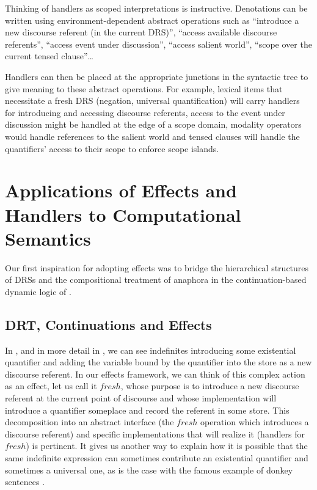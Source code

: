 \documentclass{article}
\begin{document}
Thinking of handlers as scoped interpretations is instructive. Denotations can
be written using environment-dependent abstract operations such as ``introduce
a new discourse referent (in the current DRS)'', ``access available discourse
referents'', ``access event under discussion'', ``access salient world'',
``scope over the current tensed clause''\ldots

Handlers can then be placed at the appropriate junctions in the syntactic tree
to give meaning to these abstract operations. For example, lexical items that
necessitate a fresh DRS (negation, universal quantification) will carry
handlers for introducing and accessing discourse referents, access to the
event under discussion might be handled at the edge of a scope domain,
modality operators would handle references to the salient world and tensed
clauses will handle the quantifiers' access to their scope to enforce scope
islands.

\section{Applications of Effects and Handlers to Computational Semantics}

Our first inspiration for adopting effects was to bridge the hierarchical
structures of DRSs and the compositional treatment of anaphora in the
continuation-based dynamic logic of \citet{de2006towards}.

\subsection{DRT, Continuations and Effects}

In \citet{de2006towards}, and in more detail in
\citet{lebedeva2012expression}, we can see indefinites introducing some
existential quantifier and adding the variable bound by the quantifier into
the store as a new discourse referent. In our effects framework, we can think
of this complex action as an effect, let us call it $fresh$, whose purpose is
to introduce a new discourse referent at the current point of discourse and
whose implementation will introduce a quantifier someplace and record the
referent in some store. This decomposition into an abstract interface (the
$fresh$ operation which introduces a discourse referent) and specific
implementations that will realize it (handlers for $fresh$) is pertinent. It
gives us another way to explain how it is possible that the same indefinite
expression can sometimes contribute an existential quantifier and sometimes a
universal one, as is the case with the famous example of donkey sentences
\citep{kamp1993discourse}.
\end{document}
